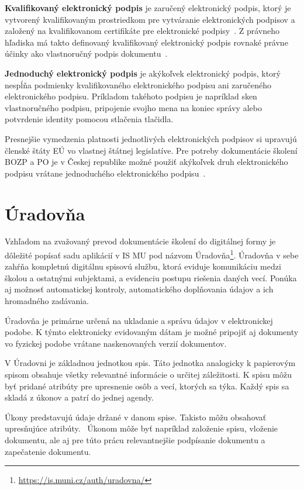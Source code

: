 \documentclass[
  digital,     %
  oneside,     %
  nosansbold,  %
  nocolorbold, %
  lof,         %
  nolot,         %
]{fithesis4}
\begin{document}
\textbf{Kvalifikovaný elektronický podpis} je zaručený elektronický podpis, ktorý je vytvorený kvalifikovaným prostriedkom pre vytváranie elektronických podpisov a založený na kvalifikovanom certifikáte pre elektronické podpisy~\cite[čl.~3,~odst.~12]{eidas2024}. Z právneho hľadiska má takto definovaný kvalifikovaný elektronický podpis rovnaké právne účinky ako vlastnoručný podpis dokumentu~\cite[čl.~25,~odst.~2]{eidas2024}.

\textbf{Jednoduchý elektronický podpis} je akýkoľvek elektronický podpis, ktorý nespĺňa podmienky kvalifikovaného elektronického podpisu ani zaručeného elektronického podpisu. Príkladom takéhoto podpisu je napríklad sken vlastnoručného podpisu, pripojenie svojho mena na koniec správy alebo potvrdenie identity pomocou stlačenia tlačidla.

Presnejšie vymedzenia platnosti jednotlivých elektronických podpisov si upravujú členské štáty EÚ vo vlastnej štátnej legislatíve. Pre potreby dokumentácie školení BOZP a PO je v Českej republike možné použiť akýkoľvek druh elektronického podpisu vrátane jednoduchého elektronického podpisu~\cite[§~7]{cesko_el_podpisy}.


\chapter{Úradovňa}
\label{kap-5}
Vzhľadom na zvažovaný prevod dokumentácie školení do digitálnej formy je dôležité popísať sadu aplikácií v IS MU pod názvom Úradovňa\footnote{\url{https://is.muni.cz/auth/uradovna/}}. Úradovňa v sebe zahŕňa kompletnú digitálnu spisovú službu, ktorá eviduje komunikáciu medzi školou a ostatnými subjektami, a evidenciu postupu riešenia daných vecí. Ponúka aj možnosť automatickej kontroly, automatického doplňovania údajov a ich hromadného zadávania.~\cite{uradovna2024}

Úradovňa je primárne určená na ukladanie a správu údajov v elektronickej podobe. K týmto elektronicky evidovaným dátam je možné pripojiť aj dokumenty vo fyzickej podobe vrátane naskenovaných verzií dokumentov.~\cite{uradovna2024}

V Úradovni je základnou jednotkou spis. Táto jednotka analogicky k papierovým spisom obsahuje všetky relevantné informácie o určitej záležitosti. K spisu môžu byť pridané atribúty pre upresnenie osôb a vecí, ktorých sa týka. Každý spis sa skladá z úkonov a patrí do jednej agendy.~\cite{uradovna2024}

Úkony predstavujú údaje držané v danom spise. Takisto môžu obsahovať upresňujúce atribúty.~\cite{uradovna2024} Úkonom môže byť napríklad založenie spisu, vloženie dokumentu, ale aj pre túto prácu relevantnejšie podpísanie dokumentu a zapečatenie dokumentu.
\end{document}
